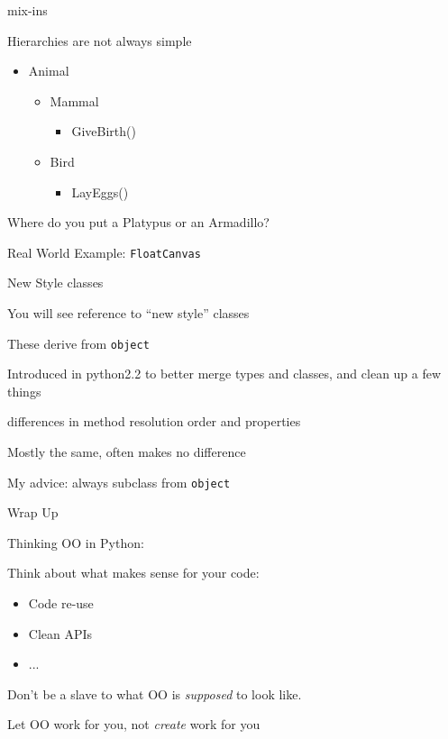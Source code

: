 \documentclass{beamer}
\begin{document}
\begin{frame}[fragile]{mix-ins}

\vfill
{\Large Hierarchies are not always simple}
\vfill
\begin{itemize}
  \item Animal
  \begin{itemize}
    \item Mammal
    \begin{itemize}
      \item GiveBirth()
    \end{itemize}
    \item Bird
    \begin{itemize}
      \item LayEggs()
    \end{itemize}
  \end{itemize}
\end{itemize}
\vfill
{\Large Where do you put a Platypus or an Armadillo?}

\vfill
{\Large Real World Example: \verb|FloatCanvas|}
\end{frame} 

\begin{frame}[fragile]{New Style classes}

{\Large You will see reference to ``new style'' classes}

\vfill
{\Large These derive from \verb|object|}

\vfill
{\Large Introduced in python2.2 to better merge types and classes, and clean up a few things}

\vfill
{\Large differences in method resolution order and properties}

\vfill
{\Large Mostly the same, often makes no difference}

\vfill
{\Large My advice: always subclass from \verb|object|}

\end{frame}


\begin{frame}[fragile]{Wrap Up}

{\LARGE Thinking OO in Python:}

\vfill
{\large Think about what makes sense for your code:}
\begin{itemize}
  \item {\large Code re-use}
  \item {\large Clean APIs}
  \item {\large ... }
\end{itemize}

\vfill
{\large Don't be a slave to what OO is \emph{supposed} to look like. }

\vfill
{\large Let OO work for you, not \emph{create} work for you}

\end{frame}
\end{document}
